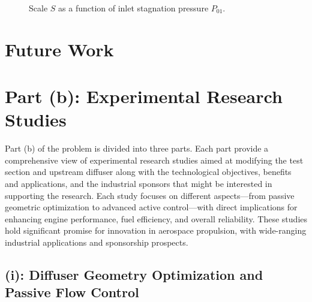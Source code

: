\documentclass[12pt,a4paper]{article}
\begin{document}
\begin{figure}[h!]
  \centering
  \caption{Scale \(S\) as a function of inlet stagnation pressure \(P_{01}\).}
  \label{fig:scale_curve}
\end{figure}


\clearpage

\section*{Future Work}
\section*{Part (b): Experimental Research Studies}

Part (b) of the problem is divided into three parts. Each part provide a comprehensive view of experimental research studies aimed at modifying the test section and upstream diffuser along with the technological objectives, benefits and applications, and the industrial sponsors that might be interested in supporting the research. Each study focuses on different aspects—from passive geometric optimization to advanced active control—with direct implications for enhancing engine performance, fuel efficiency, and overall reliability. These studies hold significant promise for innovation in aerospace propulsion, with wide-ranging industrial applications and sponsorship prospects.



\subsection*{(i): Diffuser Geometry Optimization and Passive Flow Control}
\end{document}
